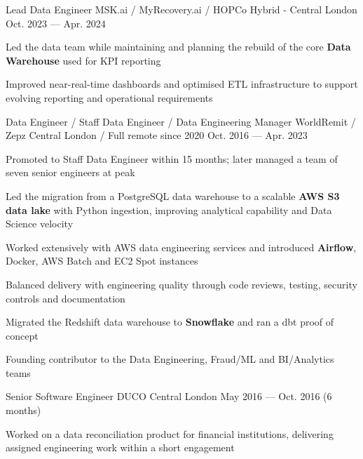 \begin{cventries}
  \cventry
  {Lead Data Engineer} %
  {MSK.ai / MyRecovery.ai / HOPCo } %
  {Hybrid - Central London} %
  {Oct. 2023 --- Apr. 2024} %
  {
    \begin{cvitems} %
    \item {Led the data team while maintaining and planning the rebuild of the core \textbf{Data Warehouse} used for KPI reporting}
    \item {Improved near-real-time dashboards and optimised ETL infrastructure to support evolving reporting and operational requirements}
    \end{cvitems}
  }

  \cventry
  {Data Engineer / Staff Data Engineer / Data Engineering Manager} %
  {WorldRemit / Zepz } %
  {Central London / Full remote since 2020} %
  {Oct. 2016 --- Apr. 2023} %
  {
    \begin{cvitems} %
    \item {Promoted to Staff Data Engineer within 15 months; later managed a team of seven senior engineers at peak}
    \item {Led the migration from a PostgreSQL data warehouse to a scalable \textbf{AWS S3 data lake} with Python ingestion, improving analytical capability and Data Science velocity}
    \item {Worked extensively with AWS data engineering services and introduced \textbf{Airflow}, Docker, AWS Batch and EC2 Spot instances}
    \item {Balanced delivery with engineering quality through code reviews, testing, security controls and documentation}
    \item {Migrated the Redshift data warehouse to \textbf{Snowflake} and ran a dbt proof of concept}
    \item {Founding contributor to the Data Engineering, Fraud/ML and BI/Analytics teams}
    \end{cvitems}
  }

  \cventry
  {Senior Software Engineer} %
  {DUCO } %
  {Central London} %
  {May 2016 --- Oct. 2016 (6 months)} %
  {
    \begin{cvitems} %
    \item {Worked on a data reconciliation product for financial institutions, delivering assigned engineering work within a short engagement}
    \end{cvitems}
  }


\end{cventries}
